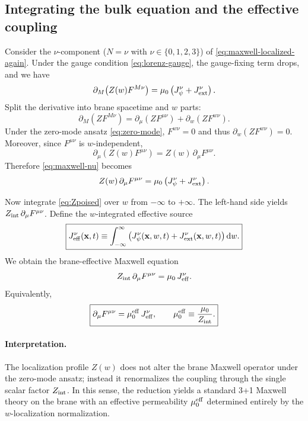 \documentclass[11pt]{article}
\newcommand{\Zint}{Z_{\rm int}}
\begin{document}
\subsection{Integrating the bulk equation and the effective coupling}
\label{sec:emreduction-integrate}

Consider the $\nu$-component ($N=\nu$ with $\nu\in\{0,1,2,3\}$) of \eqref{eq:maxwell-localized-again}. Under the gauge condition \eqref{eq:lorenz-gauge}, the gauge-fixing term drops, and we have
\begin{equation}
\partial_M\!\left(Z(w)F^{M\nu}\right)
=
\mu_0\left(J_\psi^\nu+J_{\rm ext}^\nu\right).
\label{eq:maxwell-nu}
\end{equation}
Split the derivative into brane spacetime and $w$ parts:
\begin{equation}
\partial_M(ZF^{M\nu})
=
\partial_\mu(ZF^{\mu\nu})
+
\partial_w(ZF^{w\nu}).
\end{equation}
Under the zero-mode ansatz \eqref{eq:zero-mode}, $F^{w\nu}=0$ and thus $\partial_w(ZF^{w\nu})=0$. Moreover, since $F^{\mu\nu}$ is $w$-independent,
\begin{equation}
\partial_\mu\!\left(Z(w)F^{\mu\nu}\right)
=
Z(w)\,\partial_\mu F^{\mu\nu}.
\end{equation}
Therefore \eqref{eq:maxwell-nu} becomes
\begin{equation}
Z(w)\,\partial_\mu F^{\mu\nu}
=
\mu_0\left(J_\psi^\nu+J_{\rm ext}^\nu\right).
\label{eq:Zpoised}
\end{equation}

Now integrate \eqref{eq:Zpoised} over $w$ from $-\infty$ to $+\infty$. The left-hand side yields $Z_{\rm int}\,\partial_\mu F^{\mu\nu}$. Define the $w$-integrated effective source
\begin{equation}
\boxed{
J_{\rm eff}^\nu(\mathbf{x},t)
\equiv
\int_{-\infty}^{\infty}\left(J_\psi^\nu(\mathbf{x},w,t)+J_{\rm ext}^\nu(\mathbf{x},w,t)\right)\dd w.
}
\label{eq:Jeff}
\end{equation}
We obtain the brane-effective Maxwell equation
\begin{equation}
Z_{\rm int}\,\partial_\mu F^{\mu\nu}
=
\mu_0\,J_{\rm eff}^\nu.
\end{equation}
Equivalently,
\begin{equation}
\boxed{
\partial_\mu F^{\mu\nu}
=
\mu_0^{\rm eff}\,J_{\rm eff}^\nu,
\qquad
\mu_0^{\rm eff}\equiv \frac{\mu_0}{\Zint}.
}
\label{eq:brane-maxwell}
\end{equation}

\paragraph{Interpretation.}
The localization profile $Z(w)$ does not alter the brane Maxwell operator under the zero-mode ansatz; instead it renormalizes the coupling through the single scalar factor $\Zint$. In this sense, the reduction yields a standard 3+1 Maxwell theory on the brane with an effective permeability $\mu_0^{\rm eff}$ determined entirely by the $w$-localization normalization.
\end{document}
